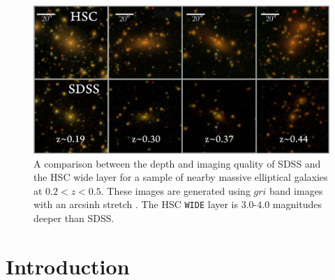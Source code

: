 \documentclass[fleqn,usenatbib]{mnras}
\begin{document}
    \begin{figure}
        \centering 
        \includegraphics[width=\textwidth]{fig/redbcg_sdss_compare}
        \caption{
            A comparison between the depth and imaging quality of SDSS and the HSC wide 
            layer for a sample of nearby massive elliptical galaxies at $0.2 < z < 0.5$.  
            These images are generated using $gri$ band images with an arcsinh stretch 
            \citep{Lupton2004}. 
            The HSC \texttt{WIDE} layer is $3.0$-$4.0$ magnitudes deeper than SDSS.
            }
        \label{fig:sdss_compare}
    \end{figure}

\section{Introduction}
    \label{sec:intro}
    
\end{document}
